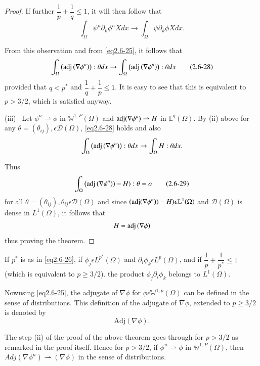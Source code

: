 \begin{proof}
  If further $\dfrac {1}{p}+\dfrac{1}{q} \le 1$, it will then follow that
  $$
  \int_\Omega \psi^n \partial_k \phi^n X dx \to \int_\Omega \psi
  \partial_k \phi X dx. 
  $$

  From this observation and from \eqref{eq2.6-25}, it follows that
  \begin{equation*}
    \int_\Omega \left(\operatorname{adj} \left(\nabla \phi^n\right)\right) :
    \theta dx \to 
    \int_\Omega \left(\operatorname{adj} \left(\nabla \phi^n\right)\right) :
    \theta dx \tag{2.6-28}  \label{eq2.6-28}
  \end{equation*}
  provided that $q < p^*$ and $\dfrac{1}{q}+\dfrac{1}{p}\le 1$. It is
  easy to see that this is equivalent to $p > 3/2$, which is satisfied
  anyway. 

\smallskip  
(iii)~ Let $\phi^n \rightharpoonup \phi $ in $\mathbb{W}^{1,P}(\Omega)$
  and $\operatorname{adj} (\nabla \phi^n)\rightharpoonup H$ in
  $\mathbb{L}^q(\Omega)$.  
  By (ii) above for any $\theta = (\theta_{ij}),\epsilon
  \mathcal{D}(\Omega)$, \eqref{eq2.6-28} holds and also  
  $$
  \int_\Omega \left(\operatorname{adj} \left(\nabla \phi^n\right)\right) :
  \theta dx \to \int_\Omega H: \theta dx. 
  $$
  
  Thus
  \begin{equation*}
    \int_\Omega \left(\operatorname{adj} \left(\nabla \phi^n\right)\right)-H):
    \theta =o \tag{2.6-29}\label{eq2.6-29}
  \end{equation*}
  for all $\theta =(\theta_{ij}), \theta_{ij} \epsilon
  \mathcal{D}(\Omega)$ and since $(\operatorname{adj} (\nabla \phi^n))-H)
  \epsilon \mathbb{L}^1(\Omega)$ and $\mathcal{D}(\Omega)$ is dense
  in $L^1(\Omega)$, it follows that  
  $$
  H =\operatorname{adj} \left(\nabla \phi\right)
  $$
  thus proving the theorem.
\end{proof}

\begin{remark}\label{chap2-rem2.6.3}%
  If $p^*$ is as in \eqref{eq2.6-26}, if $\phi_j \epsilon L^{p^*}(\Omega)$
  and $\partial_i \phi_k \epsilon L^p(\Omega)$, and if
  $\dfrac{1}{p}+\dfrac{1}{p^*}\le 1$ (which is equivalent to $p \ge
  3/2$). the product $\phi_j \partial_i \phi_k$ belongs to
  $L^1(\Omega)$. 


Now\pageoriginale using \eqref{eq2.6-25}, the adjugate of
$\nabla \phi$ for $\phi 
\epsilon \mathbb{W}^{1,p}(\Omega)$ can be defined in the sense of
distributions. This definition of the adjugate of $\nabla
\phi$, extended to $p \ge 3/2$ is denoted by
$$
\text{Adj}\left(\nabla \phi\right).
$$

The step (ii) of the proof of the above theorem goes through for $p
>3/2$ as remarked in the proof itself. Hence for $p > 3/2$, if $\phi^n
\rightharpoonup \phi$ in $\mathbb{W}^{1,P}(\Omega)$, then $Adj
(\nabla \phi^n) \rightharpoonup (\nabla \phi)$ in
the sense of distributions. 
\end{remark}

